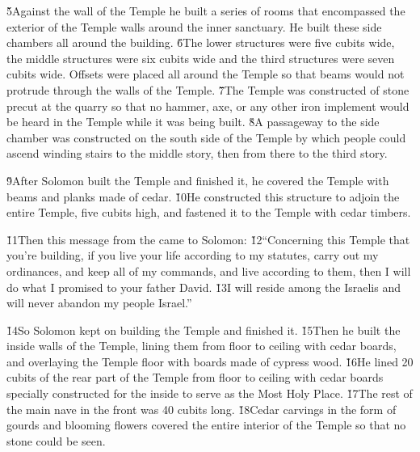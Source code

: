 \v{5}Against the wall of the Temple he built a series of rooms that encompassed the exterior of the Temple walls around the inner sanctuary. He built these side chambers all around the building. \v{6}The lower structures were five cubits wide, the middle structures were six cubits wide and the third structures were seven cubits wide. Offsets were placed all around the Temple so that beams would not protrude through the walls of the Temple. \v{7}The Temple was constructed of stone precut at the quarry so that no hammer, axe, or any other iron implement would be heard in the Temple while it was being built. \v{8}A passageway to the side chamber was constructed on the south side of the Temple by which people could ascend winding stairs to the middle story, then from there to the third story.

\v{9}After Solomon built the Temple and finished it, he covered the Temple with beams and planks made of cedar. \v{10}He constructed this structure to adjoin the entire Temple, five cubits high, and fastened it to the Temple with cedar timbers.

\v{11}Then this message from the  came to Solomon: \v{12}``Concerning this Temple that you're building, if you live your life according to my statutes, carry out my ordinances, and keep all of my commands, and live according to them, then I will do what I promised to your father David. \v{13}I will reside among the Israelis and will never abandon my people Israel.''

\v{14}So Solomon kept on building the Temple and finished it. \v{15}Then he built the inside walls of the Temple, lining them from floor to ceiling with cedar boards, and overlaying the Temple floor with boards made of cypress wood. \v{16}He lined 20 cubits of the rear part of the Temple from floor to ceiling with cedar boards specially constructed for the inside to serve as the Most Holy Place. \v{17}The rest of the main nave in the front was 40 cubits long. \v{18}Cedar carvings in the form of gourds and blooming flowers covered the entire interior of the Temple so that no stone could be seen.

